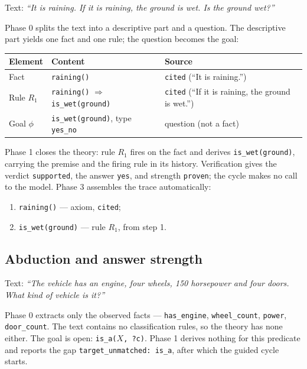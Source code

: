 \documentclass[11pt,a4paper]{article}
\begin{document}
Text: \emph{``It is raining. If it is raining, the ground is wet. Is the ground wet?''}

Phase 0 splits the text into a descriptive part and a question. The descriptive part yields
one fact and one rule; the question becomes the goal:

\begin{center}
\begin{tabular}{lll}
\toprule
\textbf{Element} & \textbf{Content} & \textbf{Source} \\
\midrule
Fact & \texttt{raining()} & \texttt{cited} (``It is raining.'') \\
Rule $R_1$ & \texttt{raining()} $\Rightarrow$ \texttt{is\_wet(ground)} & \texttt{cited} (``If it is raining, the ground is wet.'') \\
Goal $\phi$ & \texttt{is\_wet(ground)}, type \texttt{yes\_no} & question (not a fact) \\
\bottomrule
\end{tabular}
\end{center}

Phase 1 closes the theory: rule $R_1$ fires on the fact and derives
\texttt{is\_wet(ground)}, carrying the premise and the firing rule in its history.
Verification gives the verdict \texttt{supported}, the answer \texttt{yes}, and strength
\texttt{proven}; the cycle makes no call to the model. Phase 3 assembles the trace
automatically:

\begin{enumerate}
\item \texttt{raining()} --- axiom, \texttt{cited};
\item \texttt{is\_wet(ground)} --- rule $R_1$, from step 1.
\end{enumerate}

\subsection{Abduction and answer strength}

Text: \emph{``The vehicle has an engine, four wheels, 150 horsepower and four doors. What
kind of vehicle is it?''}

Phase 0 extracts only the observed facts --- \texttt{has\_engine}, \texttt{wheel\_count},
\texttt{power}, \texttt{door\_count}. The text contains no classification rules, so the
theory has none either. The goal is open: \texttt{is\_a($X$, ?c)}. Phase 1 derives nothing
for this predicate and reports the gap \texttt{target\_unmatched: is\_a}, after which the
guided cycle starts.
\end{document}
